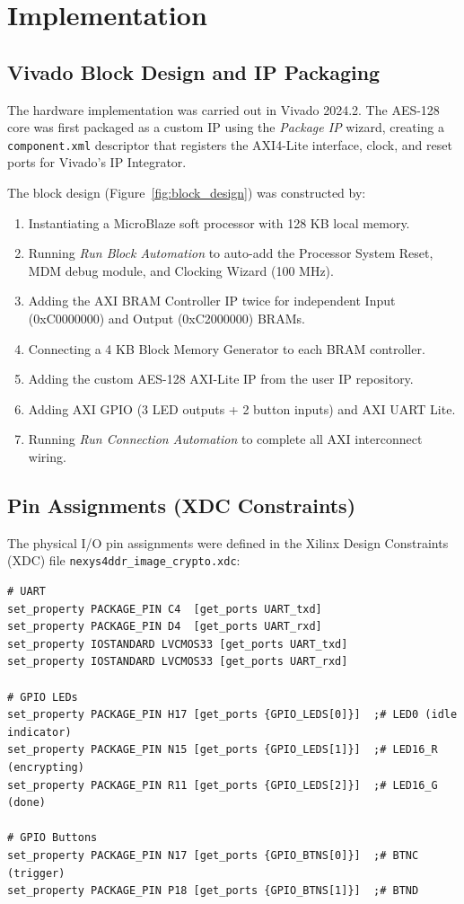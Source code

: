 \documentclass[12pt,a4paper]{article}
\begin{document}
\section{Implementation}

\subsection{Vivado Block Design and IP Packaging}

The hardware implementation was carried out in Vivado 2024.2. The AES-128 core was first packaged as a custom IP using the \textit{Package IP} wizard, creating a \texttt{component.xml} descriptor that registers the AXI4-Lite interface, clock, and reset ports for Vivado's IP Integrator.

The block design (Figure~\ref{fig:block_design}) was constructed by:
\begin{enumerate}[leftmargin=*]
    \item Instantiating a MicroBlaze soft processor with 128 KB local memory.
    \item Running \textit{Run Block Automation} to auto-add the Processor System Reset, MDM debug module, and Clocking Wizard (100 MHz).
    \item Adding the AXI BRAM Controller IP twice for independent Input (0xC0000000) and Output (0xC2000000) BRAMs.
    \item Connecting a 4 KB Block Memory Generator to each BRAM controller.
    \item Adding the custom AES-128 AXI-Lite IP from the user IP repository.
    \item Adding AXI GPIO (3 LED outputs + 2 button inputs) and AXI UART Lite.
    \item Running \textit{Run Connection Automation} to complete all AXI interconnect wiring.
\end{enumerate}

\subsection{Pin Assignments (XDC Constraints)}

The physical I/O pin assignments were defined in the Xilinx Design Constraints (XDC) file \texttt{nexys4ddr\_image\_crypto.xdc}:

\begin{lstlisting}[style=tclstyle, caption={Key XDC Pin Assignments for Nexys 4 DDR}]
# UART
set_property PACKAGE_PIN C4  [get_ports UART_txd]
set_property PACKAGE_PIN D4  [get_ports UART_rxd]
set_property IOSTANDARD LVCMOS33 [get_ports UART_txd]
set_property IOSTANDARD LVCMOS33 [get_ports UART_rxd]

# GPIO LEDs
set_property PACKAGE_PIN H17 [get_ports {GPIO_LEDS[0]}]  ;# LED0 (idle indicator)
set_property PACKAGE_PIN N15 [get_ports {GPIO_LEDS[1]}]  ;# LED16_R (encrypting)
set_property PACKAGE_PIN R11 [get_ports {GPIO_LEDS[2]}]  ;# LED16_G (done)

# GPIO Buttons
set_property PACKAGE_PIN N17 [get_ports {GPIO_BTNS[0]}]  ;# BTNC (trigger)
set_property PACKAGE_PIN P18 [get_ports {GPIO_BTNS[1]}]  ;# BTND
\end{lstlisting}
\end{document}

